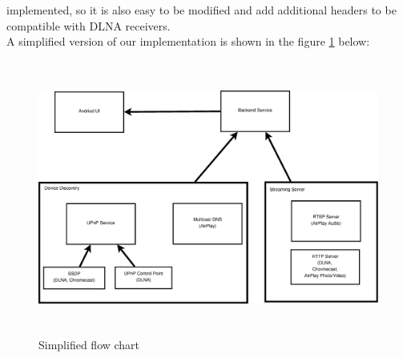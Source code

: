 implemented, so it is also easy to be modified and add additional headers to be
compatible with DLNA receivers.
\\
A simplified version of our implementation is shown in the figure \ref{chart3}
below:
\begin{figure}[htb]
\centering \includegraphics[height=9cm]{charts/chart3}
\caption{Simplified flow chart \label{chart3}}
\end{figure}

